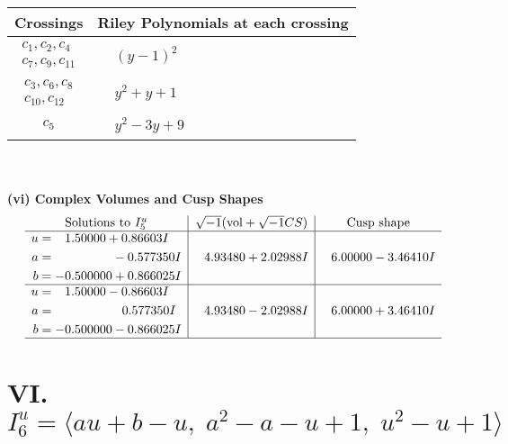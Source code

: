 \documentclass[1p]{elsarticle_modified}
\theoremstyle{definition}
\newcommand{\I}{\sqrt{-1}}
\begin{document}
\begin{tabular}{m{50pt}|m{274pt}}
Crossings & \hspace{64pt}Riley Polynomials at each crossing \\
\hline $$\begin{aligned}c_{1},c_{2},c_{4}\\c_{7},c_{9},c_{11}\end{aligned}$$&$\begin{aligned}
&(y-1)^2
\end{aligned}$\\
\hline $$\begin{aligned}c_{3},c_{6},c_{8}\\c_{10},c_{12}\end{aligned}$$&$\begin{aligned}
&y^2+y+1
\end{aligned}$\\
\hline $$\begin{aligned}c_{5}\end{aligned}$$&$\begin{aligned}
&y^2-3 y+9
\end{aligned}$\\
\hline
\end{tabular}\\~\\
\newpage\flushleft \textbf{(vi) Complex Volumes and Cusp Shapes}
$$\begin{array}{c|c|c}  
\text{Solutions to }I^u_{5}& \I (\text{vol} + \sqrt{-1}CS) & \text{Cusp shape}\\
 \hline 
\begin{aligned}
u &= \phantom{-}1.50000 + 0.86603 I \\
a &= \phantom{-0.000000 } -0.577350 I \\
b &= -0.500000 + 0.866025 I\end{aligned}
 & \phantom{-}4.93480 + 2.02988 I & \phantom{-}6.00000 - 3.46410 I \\ \hline\begin{aligned}
u &= \phantom{-}1.50000 - 0.86603 I \\
a &= \phantom{-0.000000 -}0.577350 I \\
b &= -0.500000 - 0.866025 I\end{aligned}
 & \phantom{-}4.93480 - 2.02988 I & \phantom{-}6.00000 + 3.46410 I\\
 \hline 
 \end{array}$$\newpage\newpage\renewcommand{\arraystretch}{1}
\centering \section*{VI. $I^u_{6}= \langle a u+b- u,\;a^2- a- u+1,\;u^2- u+1 \rangle$}
\end{document}
